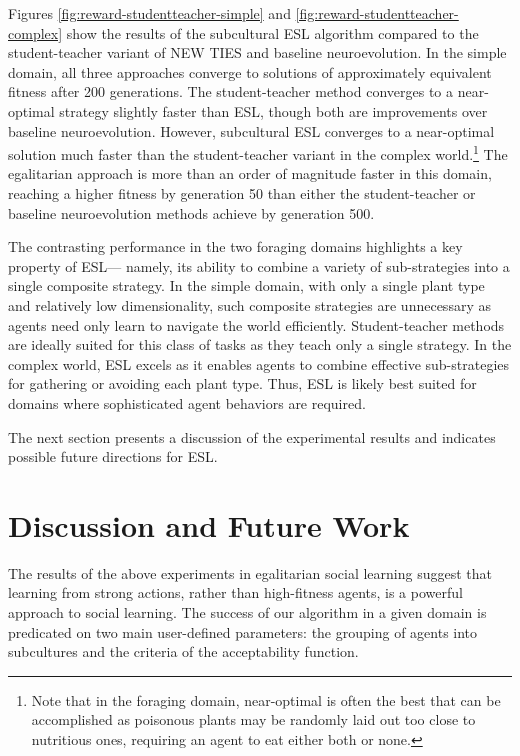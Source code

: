 \documentclass{sig-alternate}
\begin{document}
Figures \ref{fig:reward-studentteacher-simple} and \ref{fig:reward-studentteacher-complex} show the results of the subcultural ESL algorithm compared to the student-teacher variant of NEW TIES and baseline neuroevolution. In the simple domain, all three approaches converge to solutions of approximately equivalent fitness after 200 generations. The student-teacher method converges to a near-optimal strategy slightly faster than ESL, though both are improvements over baseline neuroevolution. However, subcultural ESL converges to a near-optimal solution much faster than the student-teacher variant in the complex world.\footnote{Note that in the foraging domain, near-optimal is often the best that can be accomplished as poisonous plants may be randomly laid out too close to nutritious ones, requiring an agent to eat either both or none.} The egalitarian approach is more than an order of magnitude faster in this domain, reaching a higher fitness by generation 50 than either the student-teacher or baseline neuroevolution methods achieve by generation 500.

The contrasting performance in the two foraging domains highlights a key property of ESL--- namely, its ability to combine a variety of sub-strategies into a single composite strategy. In the simple domain, with only a single plant type and relatively low dimensionality, such composite strategies are unnecessary as agents need only learn to navigate the world efficiently. Student-teacher methods are ideally suited for this class of tasks as they teach only a single strategy. In the complex world, ESL excels as it enables agents to combine effective sub-strategies for gathering or avoiding each plant type. Thus, ESL is likely best suited for domains where sophisticated agent behaviors are required.

The next section presents a discussion of the experimental results and indicates possible future directions for ESL.

\section{Discussion and Future Work}
\label{sec:future}
The results of the above experiments in egalitarian social learning suggest that learning from strong actions, rather than high-fitness agents, is a powerful approach to social learning. The success of our algorithm in a given domain is predicated on two main user-defined parameters: the grouping of agents into subcultures and the criteria of the acceptability function.
\end{document}
